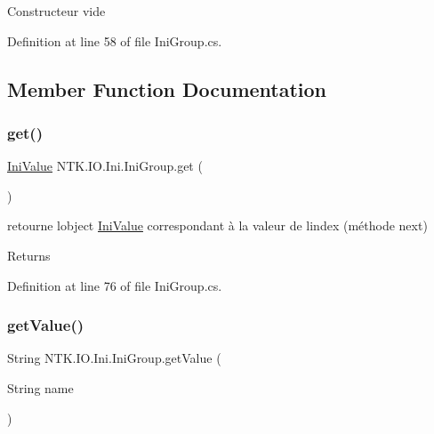 Constructeur vide 



Definition at line 58 of file Ini\+Group.\+cs.



\subsection{Member Function Documentation}
\mbox{\label{class_n_t_k_1_1_i_o_1_1_ini_1_1_ini_group_a385dfd8ae8e0f6e79ca5f5798783f863}} 
\subsubsection{\texorpdfstring{get()}{get()}}
{\footnotesize\ttfamily \mbox{\hyperlink{class_n_t_k_1_1_i_o_1_1_ini_1_1_ini_value}{Ini\+Value}} N\+T\+K.\+I\+O.\+Ini.\+Ini\+Group.\+get (\begin{DoxyParamCaption}{ }\end{DoxyParamCaption})}



retourne l\textquotesingle{}object \mbox{\hyperlink{class_n_t_k_1_1_i_o_1_1_ini_1_1_ini_value}{Ini\+Value}} correspondant à la valeur de l\textquotesingle{}index (méthode next) 

\begin{DoxyReturn}{Returns}

\end{DoxyReturn}


Definition at line 76 of file Ini\+Group.\+cs.

\mbox{\label{class_n_t_k_1_1_i_o_1_1_ini_1_1_ini_group_a240303ccd568669185baea6962e9b100}} 
\subsubsection{\texorpdfstring{getValue()}{getValue()}}
{\footnotesize\ttfamily String N\+T\+K.\+I\+O.\+Ini.\+Ini\+Group.\+get\+Value (\begin{DoxyParamCaption}\item[{String}]{name }\end{DoxyParamCaption})}



